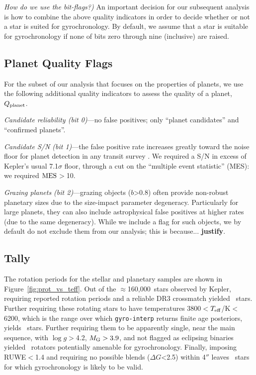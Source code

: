 \documentclass[11pt,twocolumn,tighten]{aastex63}
\newcommand{\nkeplerstars}{$\approx$160{,}000}
\begin{document}
{\it How do we use the bit-flags?)}
An important decision for our subsequent analysis is how to combine
the above quality indicators in order to decide whether or not a star is suited for
gyrochronology.  By default, we assume that a star is suitable for
gyrochronology if none of bits zero through nine (inclusive) are
raised.


\subsection{Planet Quality Flags}
\label{subsec:plflags}
For the subset of our analysis that focuses on the properties of
planets, we use the following additional quality indicators to assess 
the quality of a planet, $Q_{\rm planet}$.

{\it Candidate reliability (bit 0)}---no false positives; only
``planet candidates'' and ``confirmed planets''.

{\it Candidate S/N (bit 1)}---the false positive rate increases
greatly toward the noise floor for planet detection in any transit survey \citep[e.g.][]{2002ApJ...564..495J}.  We
required a S/N in excess of Kepler's usual 7.1$\sigma$ floor, through a cut on the
``multiple event statistic'' (MES): we required ${\rm MES}$$>$10.

{\it Grazing planets (bit 2)}---grazing objects ($b$>0.8) often
provide non-robust planetary sizes due to the size-impact parameter
degeneracy.  Particularly for large planets, they can also include
astrophysical false positives at higher rates (due to the same
degeneracy).  While we include a flag for such objects, we by default
do not exclude them from our analysis; this is because...{\bf
justify}.



\subsection{Tally}
\label{subsec:tally}


The rotation periods for the stellar and planetary samples are shown
in Figure~\ref{fig:prot_vs_teff}.  Out of the \nkeplerstars\ stars
observed by Kepler, requiring reported rotation periods and a reliable
DR3 crossmatch yielded \nuniqstarsantosrot\ stars.  Further requiring
these rotating stars to have temperatures 3800$<$$T_{\rm
eff}$/K$<$6200, which is the range over which \texttt{gyro-interp}
returns finite age posteriors, yields \nuniqstarsantosrotteffcut\
stars.  Further requiring them to be apparently single, near the main
sequence, with $\log g$$>$4.2, $M_{\rm G}>3.9$, and not flagged as
eclipsing binaries yielded \nuniqstarsantosallbutruwe\ rotators
potentially amenable for gyrochronology.  Finally, imposing RUWE$<$1.4
and requiring no possible blends ($\Delta G$<2.5) within 4$''$ leaves
\nuniqstarsantosrotgyroappl\ stars for which gyrochronology is likely
to be valid.
\end{document}
